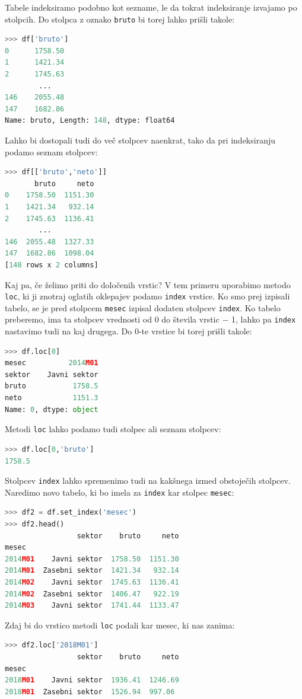 Tabele indeksiramo podobno kot sezname, le da tokrat indeksiranje izvajamo po stolpcih. Do stolpca z oznako  \texttt{bruto} bi torej lahko prišli takole:
\begin{lstlisting}[language=python]
>>> df['bruto']
0      1758.50
1      1421.34
2      1745.63
        ...
146    2055.48
147    1682.86
Name: bruto, Length: 148, dtype: float64
\end{lstlisting}
Lahko bi dostopali tudi do več stolpcev naenkrat, tako da pri indeksiranju podamo seznam stolpcev:
\begin{lstlisting}[language=python]
>>> df[['bruto','neto']]
       bruto     neto
0    1758.50  1151.30
1    1421.34   932.14
2    1745.63  1136.41
        ...
146  2055.48  1327.33
147  1682.86  1098.04
[148 rows x 2 columns]
\end{lstlisting}

Kaj pa, če želimo priti do določenih vrstic? V tem primeru uporabimo metodo \texttt{loc}, ki ji znotraj oglatih oklepajev podamo \texttt{index} vrstice. Ko smo prej izpisali tabelo, se je pred stolpcem \texttt{mesec} izpisal dodaten stolpcev \texttt{index}. Ko tabelo preberemo, ima ta stolpcev vrednosti od 0 do števila vrstic $-$ 1, lahko pa \texttt{index} nastavimo tudi na kaj drugega. Do 0-te vrstice bi torej prišli takole:
\begin{lstlisting}[language=python]
>>> df.loc[0]
mesec          2014M01
sektor    Javni sektor
bruto           1758.5
neto            1151.3
Name: 0, dtype: object
\end{lstlisting}
Metodi \texttt{loc} lahko podamo tudi stolpec ali seznam stolpcev:
\begin{lstlisting}[language=python]
>>> df.loc[0,'bruto']
1758.5
\end{lstlisting}
Stolpcev \texttt{index} lahko spremenimo tudi na kakšnega izmed obstoječih stolpcev. Naredimo novo tabelo, ki bo imela za \texttt{index} kar stolpec \texttt{mesec}:
\begin{lstlisting}[language=python]
>>> df2 = df.set_index('mesec')
>>> df2.head()
                 sektor    bruto     neto
mesec                                    
2014M01    Javni sektor  1758.50  1151.30
2014M01  Zasebni sektor  1421.34   932.14
2014M02    Javni sektor  1745.63  1136.41
2014M02  Zasebni sektor  1406.47   922.19
2014M03    Javni sektor  1741.44  1133.47
\end{lstlisting}
Zdaj bi do vrstico metodi \texttt{loc} podali kar mesec, ki nas zanima:
\begin{lstlisting}[language=python]
>>> df2.loc['2018M01']
                 sektor    bruto     neto
mesec                                    
2018M01    Javni sektor  1936.41  1246.69
2018M01  Zasebni sektor  1526.94  997.06
\end{lstlisting}

